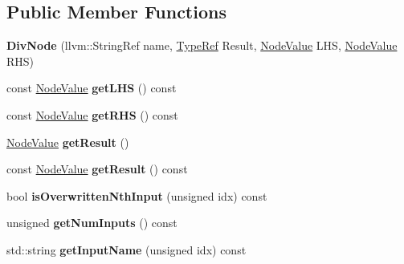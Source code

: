 \subsection*{Public Member Functions}
\begin{DoxyCompactItemize}
\item 
\mbox{\label{classglow_1_1_div_node_ab0a52dd5f946fc332d8fc01115c2f0bd}} 
{\bfseries Div\+Node} (llvm\+::\+String\+Ref name, \hyperlink{structglow_1_1_type}{Type\+Ref} Result, \hyperlink{structglow_1_1_node_value}{Node\+Value} L\+HS, \hyperlink{structglow_1_1_node_value}{Node\+Value} R\+HS)
\item 
\mbox{\label{classglow_1_1_div_node_a57b1db3cf8ac9220f35915bb2fc318fd}} 
const \hyperlink{structglow_1_1_node_value}{Node\+Value} {\bfseries get\+L\+HS} () const
\item 
\mbox{\label{classglow_1_1_div_node_a203009f160af5cc58123438deb473125}} 
const \hyperlink{structglow_1_1_node_value}{Node\+Value} {\bfseries get\+R\+HS} () const
\item 
\mbox{\label{classglow_1_1_div_node_a137c042843d29529716c2820574a515b}} 
\hyperlink{structglow_1_1_node_value}{Node\+Value} {\bfseries get\+Result} ()
\item 
\mbox{\label{classglow_1_1_div_node_a28e61b49c0d06e1476a9882180c0628b}} 
const \hyperlink{structglow_1_1_node_value}{Node\+Value} {\bfseries get\+Result} () const
\item 
\mbox{\label{classglow_1_1_div_node_a19f5c62a514efa9da933b1d319cffca3}} 
bool {\bfseries is\+Overwritten\+Nth\+Input} (unsigned idx) const
\item 
\mbox{\label{classglow_1_1_div_node_a5805829a599518d00e2601e0083c7094}} 
unsigned {\bfseries get\+Num\+Inputs} () const
\item 
\mbox{\label{classglow_1_1_div_node_ad3c1298be4b703be104093dd29801fb0}} 
std\+::string {\bfseries get\+Input\+Name} (unsigned idx) const
\item 
\mbox{\label{classglow_1_1_div_node_a9703a73427267173ceeb8847b6b9c6f2}} 

\end{DoxyCompactItemize}
